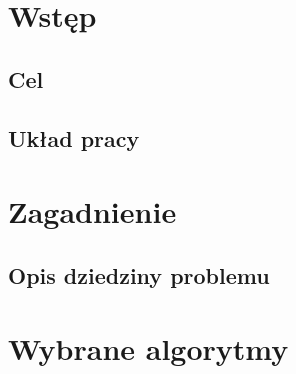 \chapter{Wstęp}\label{Chapter_Wstep}

\section{Cel}\label{Section_Aim}

\section{Układ pracy}\label{Section_Layout}

\chapter{Zagadnienie }\label{Chapter_Domain}
\section{Opis dziedziny problemu}\label{Section_Problematyka}





\chapter{Wybrane algorytmy }\label{Chapter_Algorytmy}

